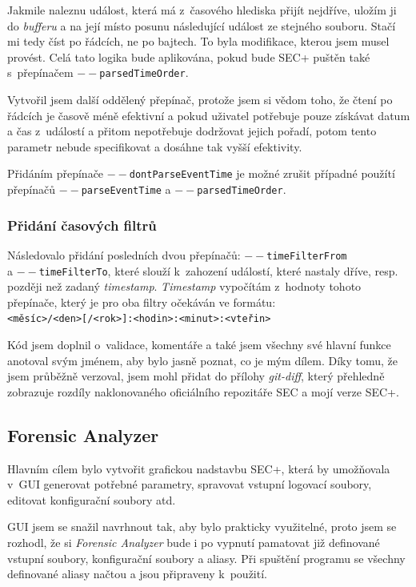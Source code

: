 \documentclass[thesis=B,czech]{FITthesis}[2012/06/26]
\begin{document}
Jakmile naleznu událost, která má z~časového hlediska přijít nejdříve, uložím ji do \textit{bufferu} a na její místo posunu následující událost ze stejného souboru. Stačí mi tedy číst po řádcích, ne po bajtech. To byla modifikace, kterou jsem musel provést. Celá tato logika bude aplikována, pokud bude SEC+ puštěn také s~přepínačem \texttt{$--$parsedTimeOrder}. 

Vytvořil jsem další oddělený přepínač, protože jsem si vědom toho, že čtení po řádcích je časově méně efektivní a pokud uživatel potřebuje pouze získávat datum a čas z~událostí a přitom nepotřebuje dodržovat jejich pořadí, potom tento parametr nebude specifikovat a dosáhne tak vyšší efektivity.

Přidáním přepínače \texttt{$--$dontParseEventTime} je možné zrušit případné použítí přepínačů \texttt{$--$parseEventTime} a \texttt{$--$parsedTimeOrder}.

\subsubsection{Přidání časových filtrů}

Následovalo přidání posledních dvou přepínačů: \texttt{$--$timeFilterFrom} \\a \texttt{$--$timeFilterTo}, které slouží k~zahození událostí, které nastaly dříve, resp. později než zadaný \textit{timestamp}. \textit{Timestamp} vypočítám z~hodnoty tohoto přepínače, který je pro oba filtry očekáván ve formátu: \\\texttt{<měsíc>/<den>[/<rok>]:<hodin>:<minut>:<vteřin>}

Kód jsem doplnil o~validace, komentáře a také jsem všechny své hlavní funkce anotoval svým jménem, aby bylo jasně poznat, co je mým dílem. Díky tomu, že jsem průběžně verzoval, jsem mohl přidat do přílohy \textit{git-diff}, který přehledně zobrazuje rozdíly naklonovaného oficiálního repozitáře SEC a mojí verze SEC+.

\subsection{Forensic Analyzer}
Hlavním cílem bylo vytvořit grafickou nadstavbu SEC+, která by umožňovala v~GUI generovat potřebné parametry, spravovat vstupní logovací soubory, editovat konfigurační soubory atd.

GUI jsem se snažil navrhnout tak, aby bylo prakticky využitelné, proto jsem se rozhodl, že si \textit{Forensic Analyzer} bude i po vypnutí pamatovat již definované vstupní soubory, konfigurační soubory a aliasy. Při spuštění programu se všechny definované aliasy načtou a jsou připraveny k~použití. 
\end{document}
